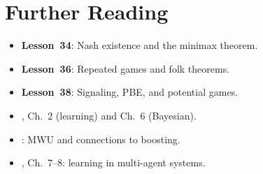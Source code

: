 \documentclass[11pt,a4paper]{article}
\begin{document}

\section{Further Reading}
\label{sec:further-reading}

\begin{itemize}
    \item \textbf{Lesson~34}: Nash existence and the minimax theorem.
    \item \textbf{Lesson~36}: Repeated games and folk theorems.
    \item \textbf{Lesson~38}: Signaling, PBE, and potential games.
    \item \citet{fudenberg1991}, Ch.~2 (learning) and Ch.~6 (Bayesian).
    \item \citet{freund1999}: MWU and connections to boosting.
    \item \citet{shoham2008}, Ch.~7--8: learning in multi-agent systems.
\end{itemize}


\end{document}
